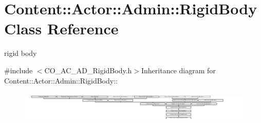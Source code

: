 \hypertarget{classContent_1_1Actor_1_1Admin_1_1RigidBody}{
\section{Content::Actor::Admin::RigidBody Class Reference}
\label{classContent_1_1Actor_1_1Admin_1_1RigidBody}
}


rigid body  


{\ttfamily \#include $<$CO\_\-AC\_\-AD\_\-RigidBody.h$>$}Inheritance diagram for Content::Actor::Admin::RigidBody::\begin{figure}[H]
\begin{center}
\leavevmode
\includegraphics[height=1.50307cm]{classContent_1_1Actor_1_1Admin_1_1RigidBody}
\end{center}
\end{figure}

